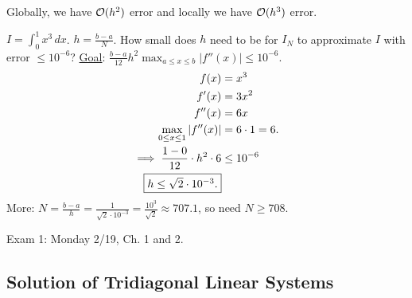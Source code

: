 \documentclass[]{article}
\begin{document}
\begin{remark}
	Globally, we have $\mathcal{O}(h^2)$ error and locally we have $\mathcal{O}(h^3)$ error.
\end{remark}
\begin{example}
	$I=\int_0^1x^3\,dx$. $h=\frac{b-a}N$.
	How small does $h$ need to be for $I_N$ to approximate $I$ with error $\leq10^{-6}$?
	\ul{Goal}: $\frac{b-a}{12}h^2\max_{a\leq x\leq b}|f''(x)|\leq10^{-6}$.
	\begin{align*}
		f(x) &= x^3 \\
		f'(x) &= 3x^2 \\
		f''(x) &= 6x \\
		\max_{0\leq x\leq 1}|f''(x)| &= 6\cdot1=6. \\
		\implies \frac{1-0}{12}\cdot h^2\cdot6 &\leq10^{-6} \\
		\fbox{$h\leq \sqrt2\cdot10^{-3}$.}
	\end{align*}
	More: $N = \frac{b-a}h = \frac1{\sqrt2\cdot10^{-3}} = \frac{10^3}{\sqrt2}\approx707.1$, so need $N\geq708$.
\end{example}

Exam 1: Monday 2/19, Ch. 1 and 2.

\subsection*{Solution of Tridiagonal Linear Systems}
\end{document}
